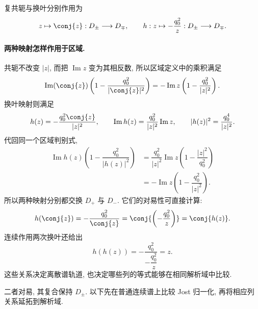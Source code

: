 复共轭与换叶分别作用为
\begin{equation}\label{eq:symmetry-domains}
z\mapsto\conj{z}:D_\pm\longrightarrow D_\mp,\qquad
h:z\mapsto-\dfrac{q_0^2}{z}:D_\pm\longrightarrow D_\mp.
\end{equation}

\paragraph{两种映射怎样作用于区域.}
共轭不改变 $|z|$, 而把 $\operatorname{Im}z$ 变为其相反数,
所以区域定义中的乘积满足
\[
\operatorname{Im}(\conj{z})
\left(1-\dfrac{q_0^2}{|\conj{z}|^2}\right)
=-\operatorname{Im}z\left(1-\dfrac{q_0^2}{|z|^2}\right).
\]
换叶映射则满足
\[
h(z)=-\dfrac{q_0^2\conj{z}}{|z|^2},
\qquad
\operatorname{Im}h(z)=\dfrac{q_0^2}{|z|^2}\operatorname{Im}z,
\qquad
|h(z)|^2=\dfrac{q_0^4}{|z|^2}.
\]
代回同一个区域判别式,
\begin{align*}
\operatorname{Im}h(z)
\left(1-\dfrac{q_0^2}{|h(z)|^2}\right)
&=\dfrac{q_0^2}{|z|^2}\operatorname{Im}z
\left(1-\dfrac{|z|^2}{q_0^2}\right)\\
&=-\operatorname{Im}z\left(1-\dfrac{q_0^2}{|z|^2}\right).
\end{align*}
所以两种映射分别都交换 $D_+$ 与 $D_-$.
它们的对易性可直接计算:
\[
h(\conj{z})=-\dfrac{q_0^2}{\conj{z}}
=\conj{\left(-\dfrac{q_0^2}{z}\right)}=\conj{h(z)}.
\]
连续作用两次换叶还给出
\[
h(h(z))=-\dfrac{q_0^2}{-\dfrac{q_0^2}{z}}=z.
\]
这些关系决定离散谱轨道, 也决定哪些列的等式能够在相同解析域中比较.

二者对易, 其复合保持 $D_\pm$. 以下先在普通连续谱上比较 Jost 归一化, 再将相应列关系延拓到解析域.

